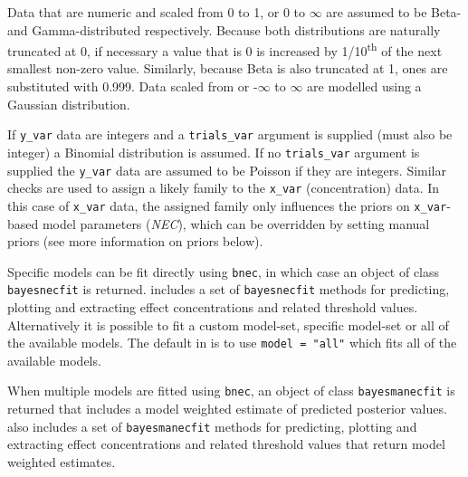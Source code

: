 \documentclass[
]{jss}
\begin{document}
Data that are numeric and scaled from 0 to 1, or 0 to \(\infty\) are
assumed to be Beta- and Gamma-distributed respectively. Because both
distributions are naturally truncated at 0, if necessary a value that is
0 is increased by 1/10\textsuperscript{th} of the next smallest non-zero
value. Similarly, because Beta is also truncated at 1, ones are
substituted with 0.999. Data scaled from or -\(\infty\) to \(\infty\)
are modelled using a Gaussian distribution.

If \texttt{y\_var} data are integers and a \texttt{trials\_var} argument
is supplied (must also be integer) a Binomial distribution is assumed.
If no \texttt{trials\_var} argument is supplied the \texttt{y\_var} data
are assumed to be Poisson if they are integers. Similar checks are used
to assign a likely family to the \texttt{x\_var} (concentration) data.
In this case of \texttt{x\_var} data, the assigned family only
influences the priors on \texttt{x\_var}-based model parameters
(\emph{NEC}), which can be overridden by setting manual priors (see more
information on priors below).

Specific models can be fit directly using \texttt{bnec}, in which case
an object of class \texttt{bayesnecfit} is returned. 
includes a set of \texttt{bayesnecfit} methods for predicting, plotting
and extracting effect concentrations and related threshold values.
Alternatively it is possible to fit a custom model-set, specific
model-set or all of the available models. The default in 
is to use \texttt{model\ =\ "all"} which fits all of the available
models.

When multiple models are fitted using \texttt{bnec}, an object of class
\texttt{bayesmanecfit} is returned that includes a model weighted
estimate of predicted posterior values.  also includes a
set of \texttt{bayesmanecfit} methods for predicting, plotting and
extracting effect concentrations and related threshold values that
return model weighted estimates.
\end{document}
